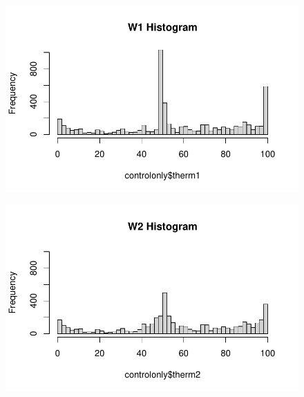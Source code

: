 \documentclass[
  letterpaper,
  DIV=11,
  numbers=noendperiod]{scrreprt}
\newenvironment{Shaded}{\begin{snugshade}}{\end{snugshade}}
\newcommand{\AttributeTok}[1]{\textcolor[rgb]{0.40,0.45,0.13}{#1}}
\newcommand{\DecValTok}[1]{\textcolor[rgb]{0.68,0.00,0.00}{#1}}
\newcommand{\FunctionTok}[1]{\textcolor[rgb]{0.28,0.35,0.67}{#1}}
\newcommand{\NormalTok}[1]{\textcolor[rgb]{0.00,0.23,0.31}{#1}}
\newcommand{\SpecialCharTok}[1]{\textcolor[rgb]{0.37,0.37,0.37}{#1}}
\newcommand{\StringTok}[1]{\textcolor[rgb]{0.13,0.47,0.30}{#1}}
\begin{document}
\begin{figure}[H]

{\centering \includegraphics{04-Visualization_files/figure-pdf/unnamed-chunk-26-1.pdf}

}

\end{figure}

\begin{Shaded}
\end{Shaded}

\begin{figure}[H]

{\centering \includegraphics{04-Visualization_files/figure-pdf/unnamed-chunk-26-2.pdf}

}

\end{figure}
\end{document}
